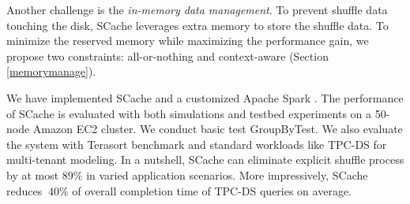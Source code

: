 Another challenge is the \textit{in-memory data management}. 
To prevent shuffle data touching the disk, SCache leverages extra memory to store the shuffle data. 
To minimize the reserved memory while maximizing the performance gain, we propose two constraints: all-or-nothing and context-aware (Section \ref{memorymanage}).

We have implemented SCache and a customized Apache Spark \cite{apachespark}. 
The performance of SCache is evaluated with both simulations and testbed experiments on a 50-node Amazon EC2 cluster. 
We conduct basic test GroupByTest. 
We also evaluate the system with Terasort \cite{spark-tera} benchmark and standard workloads like TPC-DS \cite{tpcds} for multi-tenant modeling. 
In a nutshell, SCache can eliminate explicit shuffle process by at most $89\%$ in varied application scenarios. 
More impressively, SCache reduces $~40\%$ of overall completion time of TPC-DS queries on average.

